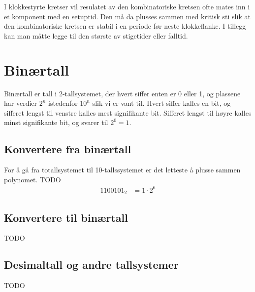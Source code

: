 \documentclass[12pt,a4paper,norsk]{article}
\begin{document}
I klokkestyrte kretser vil resulatet av den kombinatoriske kretsen ofte mates
inn i et komponent med en setuptid. Den må da plusses sammen med kritisk sti
slik at den kombinatoriske kretsen er stabil i en periode før neste
klokkeflanke. I tillegg kan man måtte legge til den største av stigetider eller
falltid.

\section{Binærtall}
Binærtall er tall i 2-tallsystemet, der hvert siffer enten er 0 eller 1, og
plassene har verdier $2^n$ istedenfor $10^n$ slik vi er vant til. Hvert siffer
kalles en bit, og sifferet lengst til venstre kalles mest signifikante bit.
Sifferet lengst til høyre kalles minst signifikante bit, og svarer til $2^0=1$.

\subsection{Konvertere fra binærtall}
For å gå fra totallsystemet til 10-tallssystemet er det letteste å plusse sammen
polynomet. TODO
\begin{align*}
  1100101_2 &= 1\cdot2^6
\end{align*}

\subsection{Konvertere til binærtall}
TODO

\subsection{Desimaltall og andre tallsystemer}
TODO
\end{document}
